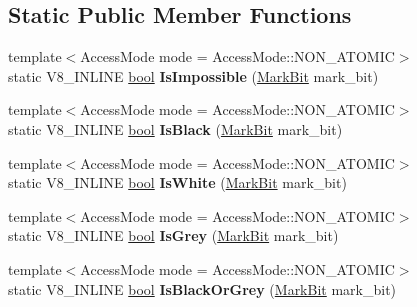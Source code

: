 \subsection*{Static Public Member Functions}
\begin{DoxyCompactItemize}
\item 
\mbox{\label{classv8_1_1internal_1_1Marking_aaf326ba6dc3d116dd354605d04f8a4ad}} 
{\footnotesize template$<$Access\+Mode mode = Access\+Mode\+::\+N\+O\+N\+\_\+\+A\+T\+O\+M\+IC$>$ }\\static V8\+\_\+\+I\+N\+L\+I\+NE \mbox{\hyperlink{classbool}{bool}} {\bfseries Is\+Impossible} (\mbox{\hyperlink{classv8_1_1internal_1_1MarkBit}{Mark\+Bit}} mark\+\_\+bit)
\item 
\mbox{\label{classv8_1_1internal_1_1Marking_a0001f18cc81908dc559f48fe510d7628}} 
{\footnotesize template$<$Access\+Mode mode = Access\+Mode\+::\+N\+O\+N\+\_\+\+A\+T\+O\+M\+IC$>$ }\\static V8\+\_\+\+I\+N\+L\+I\+NE \mbox{\hyperlink{classbool}{bool}} {\bfseries Is\+Black} (\mbox{\hyperlink{classv8_1_1internal_1_1MarkBit}{Mark\+Bit}} mark\+\_\+bit)
\item 
\mbox{\label{classv8_1_1internal_1_1Marking_abe48f00af3e03922781ca525174d0c6a}} 
{\footnotesize template$<$Access\+Mode mode = Access\+Mode\+::\+N\+O\+N\+\_\+\+A\+T\+O\+M\+IC$>$ }\\static V8\+\_\+\+I\+N\+L\+I\+NE \mbox{\hyperlink{classbool}{bool}} {\bfseries Is\+White} (\mbox{\hyperlink{classv8_1_1internal_1_1MarkBit}{Mark\+Bit}} mark\+\_\+bit)
\item 
\mbox{\label{classv8_1_1internal_1_1Marking_ad3cda69a8bbaea3c5d60391ac6c96408}} 
{\footnotesize template$<$Access\+Mode mode = Access\+Mode\+::\+N\+O\+N\+\_\+\+A\+T\+O\+M\+IC$>$ }\\static V8\+\_\+\+I\+N\+L\+I\+NE \mbox{\hyperlink{classbool}{bool}} {\bfseries Is\+Grey} (\mbox{\hyperlink{classv8_1_1internal_1_1MarkBit}{Mark\+Bit}} mark\+\_\+bit)
\item 
\mbox{\label{classv8_1_1internal_1_1Marking_a88f24fbc6172f9f3f094c80d60b54cae}} 
{\footnotesize template$<$Access\+Mode mode = Access\+Mode\+::\+N\+O\+N\+\_\+\+A\+T\+O\+M\+IC$>$ }\\static V8\+\_\+\+I\+N\+L\+I\+NE \mbox{\hyperlink{classbool}{bool}} {\bfseries Is\+Black\+Or\+Grey} (\mbox{\hyperlink{classv8_1_1internal_1_1MarkBit}{Mark\+Bit}} mark\+\_\+bit)

\end{DoxyCompactItemize}
